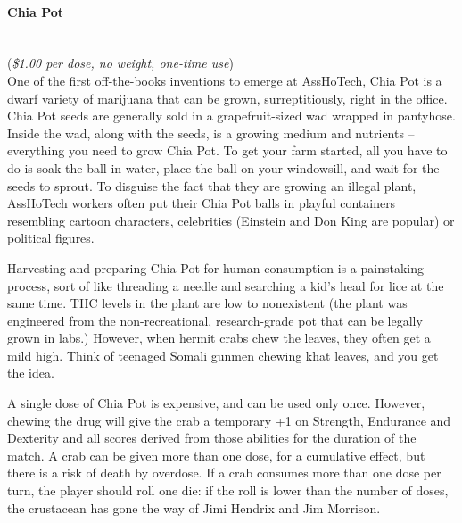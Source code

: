 \documentclass[a4paper,10pt]{article}
\begin{document}
\paragraph*{Chia Pot}
\label{sec:ChiaPot}
\hspace*{0px}\\(\textit{\$1.00 per dose, no weight, one-time use})\\
One of the first off-the-books inventions to emerge at AssHoTech, Chia Pot is a dwarf variety of marijuana that can be grown, surreptitiously, right in the office. Chia Pot seeds are generally sold in a grapefruit-sized wad wrapped in pantyhose. Inside the wad, along with the seeds, is a growing medium and nutrients -- everything you need to grow Chia Pot. To get your farm started, all you have to do is soak the ball in water, place the ball on your windowsill, and wait for the seeds to sprout. To disguise the fact that they are growing an illegal plant, AssHoTech workers often put their Chia Pot balls in playful containers resembling cartoon characters, celebrities (Einstein and Don King are popular) or political figures.

Harvesting and preparing Chia Pot for human consumption is a painstaking process, sort of like threading a needle and searching a kid's head for lice at the same time. THC levels in the plant are low to nonexistent (the plant was engineered from the non-recreational, research-grade pot that can be legally grown in labs.) However, when hermit crabs chew the leaves, they often get a mild high. Think of teenaged Somali gunmen chewing khat leaves, and you get the idea.

A single dose of Chia Pot is expensive, and can be used only once. However, chewing the drug will give the crab a temporary +1 on Strength, Endurance and Dexterity and all scores derived from those abilities for the duration of the match. A crab can be given more than one dose, for a cumulative effect, but there is a risk of death by overdose. If a crab consumes more than one dose per turn, the player should roll one die: if the roll is lower than the number of doses, the crustacean has gone the way of Jimi Hendrix and Jim Morrison.
\end{document}

